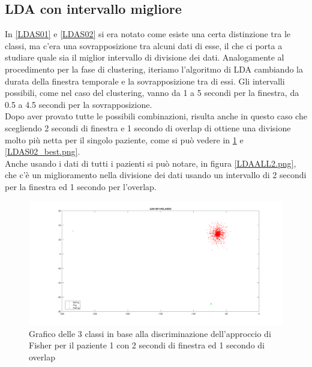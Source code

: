\subsection{LDA con intervallo migliore}
In \ref{LDAS01} e \ref{LDAS02} si era notato come esiste una certa distinzione tra le classi, ma c'era una sovrapposizione tra alcuni dati di esse, il che ci porta a studiare quale sia il miglior intervallo di divisione dei dati. Analogamente al procedimento per la fase di clustering, iteriamo l'algoritmo di LDA cambiando la durata della finestra temporale e la sovrapposizione tra di essi. Gli intervalli possibili, come nel caso del clustering, vanno da 1 a 5 secondi per la finestra, da 0.5 a 4.5 secondi per la sovrapposizione.\\
Dopo aver provato tutte le possibili combinazioni, risulta anche in questo caso che scegliendo 2 secondi di finestra e 1 secondo di overlap di ottiene una divisione molto più netta per il singolo paziente, come si può vedere in \ref{LDAS01_best.png} e \ref{LDAS02_best.png}.\\
Anche usando i dati di tutti i pazienti si può notare, in figura \ref{LDAALL2.png}, che c'è un miglioramento nella divisione dei dati usando un intervallo di 2 secondi per la finestra ed 1 secondo per l'overlap.
\begin{figure}[]
	\centering
	\includegraphics[scale=0.25]{images/LDAS01_best.png}
	\caption{Grafico delle 3 classi in base alla discriminazione dell'approccio di Fisher per il paziente 1 con 2 secondi di finestra ed 1 secondo di overlap}
	\label{LDAS01_best.png}
\end{figure}
